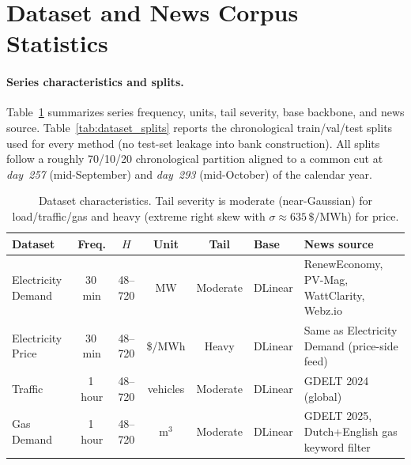 \documentclass{article}
\begin{document}



\newpage
\appendix

\section{Dataset and News Corpus Statistics}
\label{app:datasets}

\paragraph{Series characteristics and splits.}
Table~\ref{tab:dataset_specs} summarizes series frequency, units, tail severity, base backbone, and news source. Table~\ref{tab:dataset_splits} reports the chronological train/val/test splits used for every method (no test-set leakage into bank construction). All splits follow a roughly 70/10/20 chronological partition aligned to a common cut at \textit{day~257} (mid-September) and \textit{day~293} (mid-October) of the calendar year.

\begin{table}[h]
    \centering
    \caption{Dataset characteristics. Tail severity is moderate (near-Gaussian) for load/traffic/gas and heavy (extreme right skew with $\sigma\!\approx\!635\,\mathrm{\$/MWh}$) for price.}
    \label{tab:dataset_specs}
    \scriptsize
    \setlength{\tabcolsep}{7pt}
    \renewcommand{\arraystretch}{1.05}
    \begin{tabular}{lccccll}
        \toprule
        \textbf{Dataset} & \textbf{Freq.} & \textbf{$H$} & \textbf{Unit} & \textbf{Tail} & \textbf{Base} & \textbf{News source} \\
        \midrule
        Electricity Demand & 30\,min & 48--720 & MW & Moderate & DLinear & RenewEconomy, PV-Mag, WattClarity, Webz.io \\
        Electricity Price & 30\,min & 48--720 & \$/MWh & Heavy & DLinear & Same as Electricity Demand (price-side feed) \\
        Traffic & 1\,hour & 48--720 & vehicles & Moderate & DLinear & GDELT 2024 (global) \\
        Gas Demand & 1\,hour & 48--720 & m$^3$ & Moderate & DLinear & GDELT 2025, Dutch+English gas keyword filter \\
        \bottomrule
    \end{tabular}
\end{table}
\end{document}
